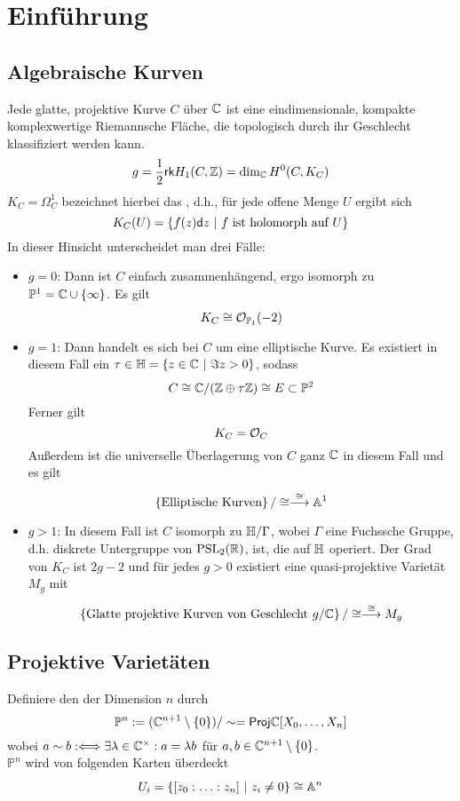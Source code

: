 \documentclass{article}
\renewcommand{\A}{\mathbb{A}}
\renewcommand{\d}{\textsf{d}}
\renewcommand{\P}{\mathbb{P}}
\begin{document}
\section{Einführung}
\subsection{Algebraische Kurven}
Jede glatte, projektive Kurve $C$ über $\mathbb{C}$ ist eine eindimensionale, kompakte komplexwertige Riemannsche Fläche, die topologisch durch ihr Geschlecht klassifiziert werden kann.
\[ g = \frac{1}{2} \textsf{rk}H_1(C,\mathbb{Z}) = \dim_{\mathbb{C}} H^0(C,K_C) \]
$K_C= \Omega_C^1$ bezeichnet hierbei das , d.h., für jede offene Menge $U$ ergibt sich
\[ K_C(U) = \set{f(z)\d z}{f \text{ ist holomorph auf } U} \]
In dieser Hinsicht unterscheidet man drei Fälle:
\begin{itemize}
\item $g = 0$: Dann ist $C$ einfach zusammenhängend, ergo isomorph zu $\P^1 = \C\cup \{\infty\}$. Es gilt
\[ K_C \isom{} \O_{\P_1} (-2) \]
\item $g= 1$: Dann handelt es sich bei $C$ um eine elliptische Kurve. Es existiert in diesem Fall ein $\tau \in \H = \set{z \in \C}{\Im z > 0}$, sodass
\[ C \isom{} \C / (\Z \oplus \tau \Z) \isom{} E \subset \P^2 \]
Ferner gilt
\[ K_C = \mathcal{O}_C \]
Außerdem ist die universelle Überlagerung von $C$ ganz $\mathbb{C}$ in diesem Fall und es gilt
\[ \set{\text{Elliptische Kurven}}{} / \isom{} \Pfeil{\isom{}} \A^1 \]
\item $g > 1$: In diesem Fall ist $C$ isomorph zu $\mathbb{H} / \Gamma$, wobei $\Gamma$ eine Fuchssche Gruppe, d.h. diskrete Untergruppe von $\text{PSL}_2(\mathbb{R})$, ist, die auf $\mathbb{H}$ operiert. Der Grad von $K_C$ ist $2g-2$ und für jedes $g> 0$ existiert eine quasi-projektive Varietät $M_g$ mit
\[ \set{\text{Glatte projektive Kurven von Geschlecht }g / \C}{} / \isom{} \Pfeil{\isom{}} M_g \]
\end{itemize}

\subsection{Projektive Varietäten}
 Definiere den  der Dimension $n$ durch
\[ \P^n := (\C^{n+1} \setminus \{0\}) / \sim = \textsf{Proj}\C[X_0,\ldots, X_n]  \]
wobei $a \sim b :\overset{}{\Longleftrightarrow} \exists \lambda \in \mathbb{C}^\times : a = \lambda b$ für $a,b \in \mathbb{C}^{n+1} \setminus\{0\}$.\\
$\P^n$ wird von folgenden Karten überdeckt
\[ U_i = \set{ [z_0 : \ldots : z_n]}{z_i \neq 0} \isom{} \A^n \]
\end{document}

